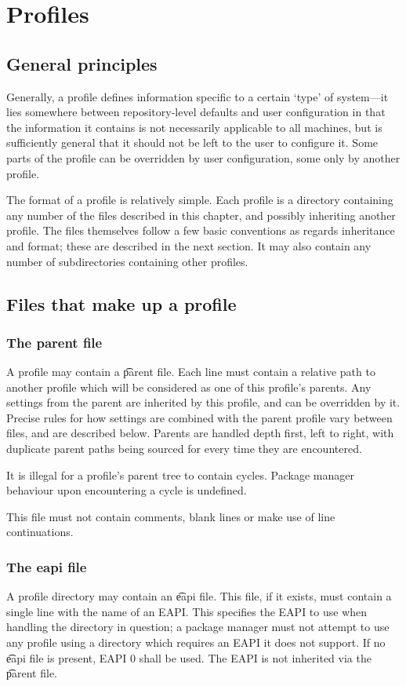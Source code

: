 \chapter{Profiles}
\label{sec:profiles}

\section{General principles}
Generally, a profile defines information specific to a certain `type' of system---it lies somewhere
between repository-level defaults and user configuration in that the information it contains is not
necessarily applicable to all machines, but is sufficiently general that it should not be left to
the user to configure it. Some parts of the profile can be overridden by user configuration, some
only by another profile.

The format of a profile is relatively simple. Each profile is a directory containing any number of
the files described in this chapter, and possibly inheriting another profile. The files themselves
follow a few basic conventions as regards inheritance and format; these are described in the next
section. It may also contain any number of subdirectories containing other profiles.

\section{Files that make up a profile}

\subsection{The parent file}
A profile may contain a \t{parent} file. Each line must contain a relative path to another profile
which will be considered as one of this profile's parents. Any settings from the parent are
inherited by this profile, and can be overridden by it. Precise rules for how settings are combined
with the parent profile vary between files, and are described below. Parents are handled depth
first, left to right, with duplicate parent paths being sourced for every time they are encountered.

It is illegal for a profile's parent tree to contain cycles. Package manager behaviour upon
encountering a cycle is undefined.

This file must not contain comments, blank lines or make use of line continuations.

\subsection{The eapi file}
\label{sec:profile-eapi}
A profile directory may contain an \t{eapi} file. This file, if it exists, must contain a single line
with the name of an EAPI. This specifies the EAPI to use when handling the directory in question; a
package manager must not attempt to use any profile using a directory which requires an EAPI it does
not support. If no \t{eapi} file is present, EAPI 0 shall be used. The EAPI is not inherited via the
\t{parent} file.

